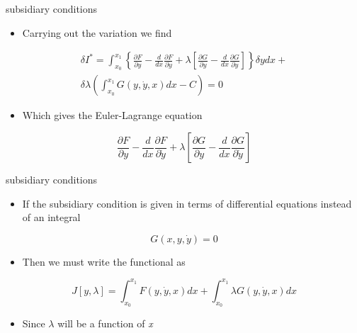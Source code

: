 \documentclass[
  letterpaper,
  ignorenonframetext,
  aspectratio=43,
  handout,
  12pt]{beamer}
\providecommand{\tightlist}{%
  \setlength{\itemsep}{0pt}\setlength{\parskip}{0pt}}
\providecommand{\tightlist}{%
\setlength{\itemsep}{0pt}\setlength{\parskip}{0pt}}
\begin{document}
\begin{frame}{subsidiary conditions}
\protect\hypertarget{subsidiary-conditions-3}{}
\begin{itemize}
\tightlist
\item
  Carrying out the variation we find
\end{itemize}

\[\begin{gathered}
  \delta I^* = \int_{x_0}^{x_1} \left \{ \frac{\partial F}{\partial y} - \frac{d}{dx} \frac{\partial F}{\partial \dot{y}} + \lambda \left [ \frac{\partial G}{\partial y} - \frac{d}{dx} \frac{\partial G}{\partial \dot{y}} \right ] \right \} \delta y dx + \\
  \delta \lambda \left( \int_{x_0}^{x_1} G(y, \dot{y}, x)dx - C \right) = 0
\end{gathered}\]

\begin{itemize}
\tightlist
\item
  Which gives the Euler-Lagrange equation
\end{itemize}

\[\frac{\partial F}{\partial y} - \frac{d}{dx} \frac{\partial F}{\partial \dot{y}} + \lambda \left[ \frac{\partial G}{\partial y} - \frac{d}{dx} \frac{\partial G}{\partial \dot{y}} \right]\]
\end{frame}

\begin{frame}{subsidiary conditions}
\protect\hypertarget{subsidiary-conditions-4}{}
\begin{itemize}
\tightlist
\item
  If the subsidiary condition is given in terms of differential
  equations instead of an integral
\end{itemize}

\[G(x,y,\dot{y}) = 0\]

\begin{itemize}
\tightlist
\item
  Then we must write the functional as
\end{itemize}

\[J[y,\lambda] = \int_{x_0}^{x_1} F(y, \dot{y}, x) dx + \int_{x_0}^{x_1} \lambda G(y, \dot{y}, x)dx\]

\begin{itemize}
\tightlist
\item
  Since \(\lambda\) will be a function of \emph{x}
\end{itemize}
\end{frame}
\end{document}
